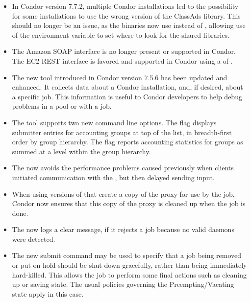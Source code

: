 \begin{itemize}

\item In Condor version 7.7.2, multiple Condor installations led to the
possibility for some installations to use the wrong version of the ClassAds 
library.
This should no longer be an issue, 
as the binaries now use  instead of , 
allowing use of the  environment variable 
to set where to look for the shared libraries.

\item The Amazon SOAP interface is no longer present or supported in Condor.
The EC2 REST interface is favored and supported in Condor
using a  of .

\item The new  tool introduced in 
Condor version 7.5.6 has been updated and enhanced.
It collects data about a Condor installation, and, if desired, 
about a specific job. 
This information is useful to Condor developers to help 
debug problems in a pool or with a job.

\item The  tool supports two new command line options.
The  flag displays submitter entries 
for accounting groups at top of the list,
 in breadth-first order by group hierarchy.
The  flag reports accounting statistics for groups 
as summed at a level within the group hierarchy.

\item The  now avoids the performance problems caused
previously when clients initiated communication with the ,
but then delayed sending input.

\item When using versions of  that create a copy of the proxy 
for use by the job, 
Condor now ensures that this copy of the proxy is cleaned up
when the job is done.

\item The  now logs a clear message, if it rejects a job
because no valid  daemons were detected.

\item The new submit command 
may be used to specify that a job being removed or put on hold should
be shut down gracefully, rather than being immediately hard-killed.
This allows the job to perform some final actions such as cleaning
up or saving state.  The usual policies governing the Preempting/Vacating
state apply in this case.  


\end{itemize}
